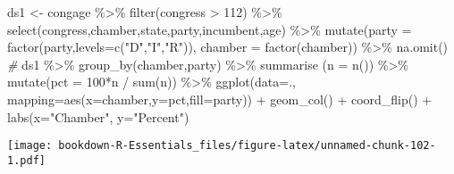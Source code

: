 \documentclass[
]{book}
\newenvironment{Shaded}{\begin{snugshade}}{\end{snugshade}}
\newcommand{\AttributeTok}[1]{\textcolor[rgb]{0.77,0.63,0.00}{#1}}
\newcommand{\CommentTok}[1]{\textcolor[rgb]{0.56,0.35,0.01}{\textit{#1}}}
\newcommand{\DecValTok}[1]{\textcolor[rgb]{0.00,0.00,0.81}{#1}}
\newcommand{\FunctionTok}[1]{\textcolor[rgb]{0.00,0.00,0.00}{#1}}
\newcommand{\NormalTok}[1]{#1}
\newcommand{\OtherTok}[1]{\textcolor[rgb]{0.56,0.35,0.01}{#1}}
\newcommand{\SpecialCharTok}[1]{\textcolor[rgb]{0.00,0.00,0.00}{#1}}
\newcommand{\StringTok}[1]{\textcolor[rgb]{0.31,0.60,0.02}{#1}}
\begin{document}
\begin{Shaded}
\begin{Highlighting}[]
\NormalTok{ds1 }\OtherTok{\textless{}{-}}\NormalTok{ congage }\SpecialCharTok{\%\textgreater{}\%} \FunctionTok{filter}\NormalTok{(congress }\SpecialCharTok{\textgreater{}} \DecValTok{112}\NormalTok{) }\SpecialCharTok{\%\textgreater{}\%} \FunctionTok{select}\NormalTok{(congress,chamber,state,party,incumbent,age) }\SpecialCharTok{\%\textgreater{}\%}
 \FunctionTok{mutate}\NormalTok{(}\AttributeTok{party =} \FunctionTok{factor}\NormalTok{(party,}\AttributeTok{levels=}\FunctionTok{c}\NormalTok{(}\StringTok{"D"}\NormalTok{,}\StringTok{"I"}\NormalTok{,}\StringTok{"R"}\NormalTok{)),}
        \AttributeTok{chamber =} \FunctionTok{factor}\NormalTok{(chamber)) }\SpecialCharTok{\%\textgreater{}\%} 
  \FunctionTok{na.omit}\NormalTok{()}
\CommentTok{\#}
\NormalTok{ds1 }\SpecialCharTok{\%\textgreater{}\%} \FunctionTok{group\_by}\NormalTok{(chamber,party)  }\SpecialCharTok{\%\textgreater{}\%}
   \FunctionTok{summarise}\NormalTok{ (}\AttributeTok{n =} \FunctionTok{n}\NormalTok{()) }\SpecialCharTok{\%\textgreater{}\%}
  \FunctionTok{mutate}\NormalTok{(}\AttributeTok{pct =} \DecValTok{100}\SpecialCharTok{*}\NormalTok{n }\SpecialCharTok{/} \FunctionTok{sum}\NormalTok{(n)) }\SpecialCharTok{\%\textgreater{}\%}
\FunctionTok{ggplot}\NormalTok{(}\AttributeTok{data=}\NormalTok{., }\AttributeTok{mapping=}\FunctionTok{aes}\NormalTok{(}\AttributeTok{x=}\NormalTok{chamber,}\AttributeTok{y=}\NormalTok{pct,}\AttributeTok{fill=}\NormalTok{party)) }\SpecialCharTok{+} 
  \FunctionTok{geom\_col}\NormalTok{() }\SpecialCharTok{+}
  \FunctionTok{coord\_flip}\NormalTok{() }\SpecialCharTok{+}
  \FunctionTok{labs}\NormalTok{(}\AttributeTok{x=}\StringTok{"Chamber"}\NormalTok{, }\AttributeTok{y=}\StringTok{"Percent"}\NormalTok{)}
\end{Highlighting}
\end{Shaded}

\texttt{[image: bookdown-R-Essentials\_files/figure-latex/unnamed-chunk-102-1.pdf]}

  
\end{document}
